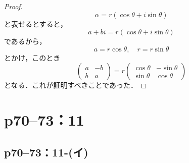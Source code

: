 \documentclass[a4paper,10pt,fleqn]{ltjsarticle}
\begin{document}
\begin{tleftbar}
    \begin{proof}
        \[
            \alpha = r (\cos \theta + i \sin \theta)
        \]
        と表せるとすると，
        \[
            a+bi = r (\cos \theta + i \sin \theta )
        \]
        であるから，
        \[
            a= r \cos \theta , \quad r = r \sin \theta
        \]
        とかけ，このとき
        \[
            \begin{pmatrix} a & -b \\ b & a \end{pmatrix} = r \begin{pmatrix} \cos \theta & -\sin \theta \\ \sin \theta & \cos \theta \end{pmatrix}
        \]
        となる．これが証明すべきことであった．
    \end{proof}
\end{tleftbar}

\newpage

\section*{p70--73：11}

\subsection*{p70--73：11-(イ)}
\end{document}
